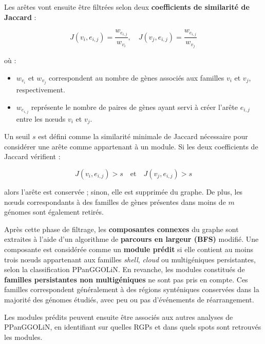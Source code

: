 Les arêtes vont ensuite être filtrées selon deux \textbf{coefficients de similarité de Jaccard} :

\begin{equation}
J(v_i, e_{i,j}) = \frac{w_{e_{i,j}}}{w_{v_i}}, \quad J(v_j, e_{i,j}) = \frac{w_{e_{i,j}}}{w_{v_j}}
\label{eq:jaccard}
\end{equation}

où :
\begin{itemize}
    \item $w_{v_i}$ et $w_{v_j}$ correspondent au nombre de gènes associés aux familles $v_i$ et $v_j$, respectivement.
    \item $w_{e_{i,j}}$ représente le nombre de paires de gènes ayant servi à créer l’arête $e_{i,j}$ entre les nœuds $v_i$ et $v_j$.
\end{itemize}

Un seuil $s$ est défini comme la similarité minimale de Jaccard nécessaire pour considérer une arête comme appartenant à un module. Si les deux coefficients de Jaccard vérifient :

\begin{equation}
J(v_i, e_{i,j}) > s \quad \text{et} \quad J(v_j, e_{i,j}) > s
\end{equation}

alors l’arête est conservée ; sinon, elle est supprimée du graphe. De plus, les n\oe uds correspondants à des familles de gènes présentes dans moins de $m$ génomes sont également retirés.

Après cette phase de filtrage, les \textbf{composantes connexes} du graphe sont extraites à l’aide d’un algorithme de \textbf{parcours en largeur (BFS)} modifié. Une composante est considérée comme un \textbf{module prédit} si elle contient au moins trois n\oe uds appartenant aux familles \textit{shell}, \textit{cloud} ou multigéniques persistantes, selon la classification PPanGGOLiN. En revanche, les modules constitués de \textbf{familles persistantes non multigéniques} ne sont pas pris en compte. Ces familles correspondent généralement à des régions synténiques conservées dans la majorité des génomes étudiés, avec peu ou pas d’événements de réarrangement.

Les modules prédits peuvent ensuite être associés aux autres analyses de PPanGGOLiN, en identifiant sur quelles RGPs et dans quels spots sont retrouvés les modules.